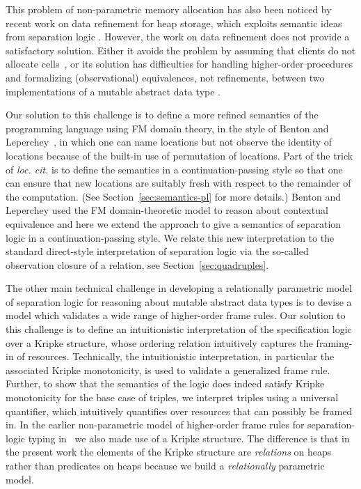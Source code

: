 \documentclass{LMCS}
\begin{document}
This problem of non-parametric memory allocation has also been noticed by
recent work on data refinement for heap storage, which exploits semantic
ideas from separation logic
\cite{mijajlovic-torpsmith-ohearn-fsttcs04,mijajlovic-yang-aplas05}.
However, the work on data refinement does not provide a satisfactory
solution.  Either it avoids the problem by assuming that clients do not
allocate cells~\cite{mijajlovic-torpsmith-ohearn-fsttcs04}, or its solution
has difficulties for handling higher-order procedures and formalizing
(observational) equivalences, not refinements, between two implementations
of a mutable abstract data type \cite{mijajlovic-yang-aplas05}.

Our solution to this challenge is to define a more refined semantics of the
programming language using FM domain theory, in the style of Benton and
Leperchey~\cite{benton}, in which one can name locations but not observe the
identity of locations because of the built-in use of permutation of
locations. 
Part of the trick of \emph{loc. cit.} is to define the semantics
in a continuation-passing style so that one can ensure that new locations
are suitably fresh with respect to the remainder of the computation. (See
Section~\ref{sec:semantics-pl} for more details.)  Benton and Leperchey
used the FM domain-theoretic model to reason about contextual equivalence
and here we extend the approach to give a semantics of separation logic in
a continuation-passing style. We relate this new interpretation to the
standard direct-style interpretation of separation logic via the so-called
observation closure  of a relation, see
Section~\ref{sec:quadruples}.

The other main technical challenge in developing a relationally parametric
model of separation logic for reasoning about mutable abstract data types
is to devise a model which validates a wide range
of higher-order frame rules.  Our solution to this challenge is to
define an intuitionistic interpretation of the specification
logic over a Kripke structure, whose ordering relation intuitively
captures the framing-in of resources.
Technically, the intuitionistic interpretation, in particular the
associated Kripke monotonicity, is used to validate a generalized frame rule.
Further, to show that the semantics of the logic does indeed satisfy
Kripke monotonicity for the base case of triples, we
interpret triples using a universal quantifier, which
intuitively quantifies over resources that can possibly be framed in.
In the earlier non-parametric model of higher-order frame rules for
separation-logic typing in~\cite{birkedal-torpsmith-yang-lics05} we also
made use of a Kripke structure. The difference is that in the present work
the elements of the Kripke structure are \emph{relations} on heaps rather than
predicates on heaps because we build a \emph{relationally} parametric
model.
\end{document}

